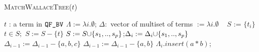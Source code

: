\begin{algorithm}[t]
 \caption{\textsc{MatchWallaceTree}($t$)}
 \label{alg:wallace}
 \begin{algorithmic}[1]
   \Ensure $t$ : a term in $\texttt{QF\_BV}$
   \State $\Lambda := \lambda i. \emptyset$;
   $\Delta : $ vector of multiset of terms $ := \lambda i. \emptyset$
   ~\Return{$\emptyset$}
   \State $S$ := $\{t_i\}$
   \State $t \in S;$ $S := S - \{t\}$
   \State $S := S {\cup} \{s_1,..,s_p\}$;$\Delta_i := \Delta_i {\cup} \{s_1,..,s_p\}$
   \State $\Delta_{i-1} := \Delta_{i-1}- \{a,b,c\}$
   \State $\Delta_{i-1} := \Delta_{i-1}- \{a,b\}$
   \State $\Lambda_i.insert( a * b )$;
   \Else~\Return{$\emptyset$}
   \EndIf
   \EndFor
   ~\Return{$\emptyset$}
   \EndFor
   \State {}
   \EndIf
   \State~\Return{$\emptyset$}
 \end{algorithmic}
\end{algorithm}  



